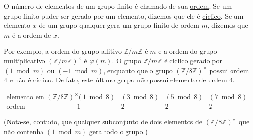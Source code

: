 \begin{definicao}
O número de elementos de um grupo finito é chamado de sua \underline{ordem}. Se um grupo finito puder ser gerado por 
um elemento, dizemos que ele é \underline{cíclico}. Se um elemento $x$ de um grupo qualquer gera um grupo finito de 
ordem $m$, dizemos que $m$ é a ordem de $x$.
\end{definicao}

Por exemplo, a ordem do grupo aditivo $\mathbb{Z}/m\mathbb{Z}$ é $m$ e a ordem do grupo multiplicativo 
$(\mathbb{Z}/m\mathbb{Z})^\times$ é $\varphi(m)$. O grupo $\mathbb{Z}/m\mathbb{Z}$ é cíclico gerado por $(1 \bmod m)$ 
ou $(-1 \bmod m)$, enquanto que o grupo $(\mathbb{Z}/8\mathbb{Z})^\times$ possui ordem $4$ e não é cíclico. De fato, 
este último grupo não possui elemento de ordem $4$.

\[
\begin{array}{c|cccc}
\text{elemento em } (\mathbb{Z}/8\mathbb{Z})^\times 
& (1 \bmod 8) & (3 \bmod 8) & (5 \bmod 8) & (7 \bmod 8) \\ \hline
\text{ordem} & 1 & 2 & 2 & 2
\end{array}
\]

(Nota-se, contudo, que qualquer subconjunto de dois elementos de $(\mathbb{Z}/8\mathbb{Z})^\times$ que não contenha 
$(1 \bmod m)$ gera todo o grupo.)
